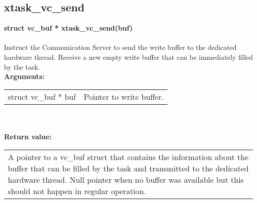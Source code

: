 \begin{samepage}
\subsection{xtask\_vc\_send}
\noindent
\textbf{struct vc\_buf * xtask\_vc\_send(buf)}\\\\
Instruct the Communication Server to send the write buffer
to the dedicated hardware thread. Receive a new empty
write buffer that can be immediately filled by the task.\\

\noindent
\textbf{Arguments:}\\
\indent\begin{tabular}{ p{4.5cm}  p{9cm} }
struct vc\_buf * buf      & Pointer to write buffer.\\            
\end{tabular}\\\\

\noindent
\textbf{Return value:}\\
\indent\begin{tabular}{  p{13.5cm} }
A pointer to a vc\_buf struct that contains the information
about the buffer that can be filled by the task and
transmitted to the dedicated hardware thread.
Null pointer when no buffer was available but this should
not happen in regular operation.
\end{tabular}
\end{samepage}

